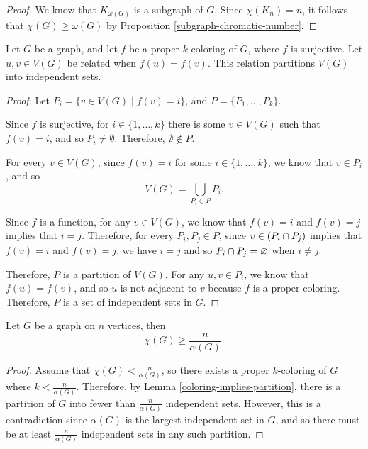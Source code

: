 \begin{proof}
    We know that $K_{\omega(G)}$ is a subgraph of $G$. Since $\chi(K_n) = n$, it follows that $\chi(G) \geq \omega(G)$ by Proposition \ref{subgraph-chromatic-number}.
\end{proof}

\begin{lemma}\label{coloring-implies-partition}
    Let $G$ be a graph, and let $f$ be a proper $k$-coloring of $G$, where $f$ is surjective. Let $u, v \in V(G)$ be related when $f(u) = f(v)$. This relation partitions $V(G)$ into independent sets.
\end{lemma}

\begin{proof}\proofbreak
    Let $P_i = \{v \in V(G) \mid f(v) = i\}$, and $P = \{P_1, \ldots, P_k\}$.

    Since $f$ is surjective, for $i \in \{1, \ldots, k\}$ there is some $v \in V(G)$ such that $f(v) = i$, and so $P_i \neq \emptyset$. Therefore, $\emptyset \notin P$.

    For every $v \in V(G)$, since $f(v) = i$ for some $i \in \{1, \ldots, k\}$, we know that $v \in P_i$, and so
    \[V(G) = \bigcup_{P_i\in P}P_i.\]

    Since $f$ is a function, for any $v \in V(G)$, we know that $f(v) = i$ and $f(v) = j$ implies that $i = j$. Therefore, for every $P_i, P_j \in P$, since $v \in (P_i \cap P_j)$ implies that $f(v) = i$ and $f(v) = j$, we have $i = j$ and so $P_i \cap P_j = \varnothing$ when $i \neq j$.

    Therefore, $P$ is a partition of $V(G)$. For any $u, v \in P_i$, we know that $f(u) = f(v)$, and so $u$ is not adjacent to $v$ because $f$ is a proper coloring. Therefore, $P$ is a set of independent sets in $G$.
\end{proof}

\begin{prop}
    Let $G$ be a graph on $n$ vertices, then
    \[\chi(G) \geq \frac{n}{\alpha(G)}.\]
\end{prop}

\begin{proof}
    Assume that $\chi(G) < \frac{n}{\alpha(G)}$, so there exists a proper $k$-coloring of $G$ where $k < \frac{n}{\alpha(G)}$. Therefore, by Lemma \ref{coloring-implies-partition}, there is a partition of $G$ into fewer than $\frac{n}{\alpha(G)}$ independent sets. However, this is a contradiction since $\alpha(G)$ is the largest independent set in $G$, and so there must be at least $\frac{n}{\alpha(G)}$ independent sets in any such partition.
\end{proof}

